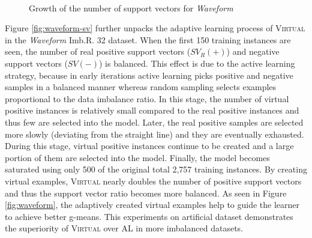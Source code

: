 \begin{figure}[t!]
  \begin{center}
     \mbox{
       \quad
      }
    \caption{Growth of the number of support vectors for \emph{Waveform}}
    \label{fig:waveform-sv-all}
  \end{center}
\end{figure}

Figure \ref{fig:waveform-sv} further unpacks the adaptive learning process of \textsc{Virtual} in the \emph{Waveform} Imb.R. 32 dataset. When the first 150 training instances are seen, the number of real positive support vectors ($SV_R(+)$) and negative support vectors ($SV(-)$) is balanced. This effect is due to the active learning strategy, because in early iterations active learning picks positive and negative samples in a balanced manner whereas random sampling selects examples proportional to the data imbalance ratio. In this stage, the number of virtual positive instances is relatively small
compared to the real positive instances and thus few are selected into the model. Later, the real positive samples are selected more slowly (deviating from the straight line) and they are eventually exhausted. During this stage, virtual positive instances continue to be created and a large portion of them are selected into the model. Finally, the model becomes saturated using only 500 of the original total 2,757 training instances. By creating virtual examples, \textsc{Virtual} nearly doubles the number of positive support vectors and thus the support vector ratio becomes more balanced. As seen in Figure \ref{fig:waveform}, the adaptively created virtual examples help to guide the learner to achieve better g-means. This experiments on artificial dataset demonstrates the superiority of \textsc{Virtual} over AL in more imbalanced datasets.

